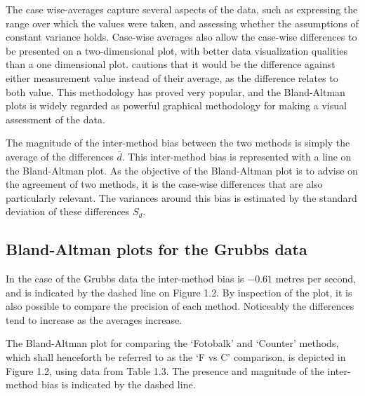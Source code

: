 \documentclass[12pt, a4paper]{report}
\theoremstyle{plain}
\theoremstyle{definition}
\theoremstyle{remark}
\begin{document}
	The case wise-averages capture several aspects of the data, such as expressing the range over which the values were taken, and assessing whether the assumptions of constant variance holds.
	Case-wise averages also allow the case-wise differences to be presented on a two-dimensional plot, with better data visualization qualities than a one dimensional plot. \citet{BA86}
	cautions that it would be the difference against either measurement value instead of their average, as the difference relates to both value. This methodology has proved very popular, and the Bland-Altman plots is widely regarded as powerful graphical methodology for making a visual assessment of the data.
	
	The magnitude of the inter-method bias between the two methods is simply the average of the differences $\bar{d}$. This inter-method bias is represented with a line on the Bland-Altman plot. As the objective of the Bland-Altman plot is to advise on the agreement of two methods, it is the case-wise differences that are also particularly relevant. The variances around this bias is estimated by the standard deviation of these differences $S_{d}$.
	
	\subsection{Bland-Altman plots for the Grubbs data}
	
	In the case of the Grubbs data the inter-method bias is $-0.61$ metres per second, and is indicated by the dashed line on Figure 1.2. By inspection of the plot, it is also possible to compare the precision of each method. Noticeably the differences tend to increase as the averages increase.
	
	
	The Bland-Altman plot for comparing the `Fotobalk' and `Counter'
	methods, which shall henceforth be referred to as the `F vs C' comparison,  is depicted in Figure 1.2, using data from Table 1.3.
	The presence and magnitude of the inter-method bias is indicated
	by the dashed line.
	\newpage
	
	
\end{document}
